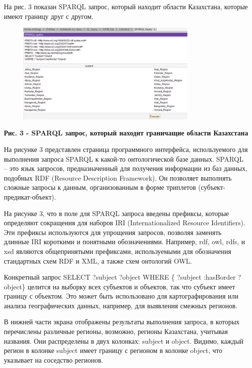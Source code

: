 На рис. 3 показан SPARQL запрос, который находит области Казахстана,
которые имеют границу друг с другом.

\begin{figure}[H]
	\centering
	\includegraphics[width=0.8\textwidth]{assets/40}
	\caption*{}
\end{figure}

\textbf{Рис. 3 - SPARQL запрос, который находит граничащие области
Казахстана}

На рисунке 3 представлен страница программного интерфейса, используемого
для выполнения запроса SPARQL к какой-то онтологической базе данных.
SPARQL -- это язык запросов, предназначенный для получения информации из
баз данных, подобных RDF (Resource Description Framework). Он позволяет
выполнять сложные запросы к данным, организованным в форме триплетов
(субъект-предикат-объект).

На рисунке 3, что в поле для SPARQL запроса введены префиксы, которые
определяют сокращения для наборов IRI (Internationalized Resource
Identifiers). Эти префиксы используются для упрощения запросов, позволяя
заменять длинные IRI короткими и понятными обозначениями. Например, rdf,
owl, rdfs, и xsd являются общепринятыми префиксами, используемыми для
обозначения стандартных схем RDF и XML, а также схем онтологий OWL.

Конкретный запрос SELECT ?subject ?object WHERE \{ ?subject :hasBorder
?object\} целится на выборку всех субъектов и объектов, так что субъект
имеет границу с объектом. Это может быть использовано для
картографирования или анализа географических данных, например, для
выявления смежных регионов.

В нижней части экрана отображены результаты выполнения запроса, в
которых перечислены различные регионы, возможно, регионы Казахстана,
учитывая названия. Они распределены в двух колонках: subject и object.
Видимо, каждый регион в колонке subject имеет границу с регионом в
колонке object, что указывает на соседство регионов.

